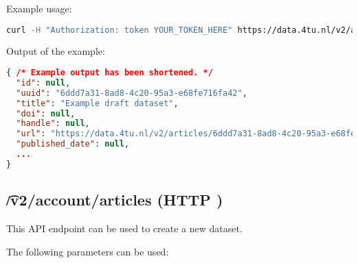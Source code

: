   Example usage:
\begin{lstlisting}[language=bash]
curl -H "Authorization: token YOUR_TOKEN_HERE" https://data.4tu.nl/v2/account/articles | jq
\end{lstlisting}

  Output of the example:
\begin{lstlisting}[language=JSON]
{ /* Example output has been shortened. */
  "id": null,
  "uuid": "6ddd7a31-8ad8-4c20-95a3-e68fe716fa42",
  "title": "Example draft dataset",
  "doi": null,
  "handle": null,
  "url": "https://data.4tu.nl/v2/articles/6ddd7a31-8ad8-4c20-95a3-e68fe716fa42",
  "published_date": null,
  ...
}
\end{lstlisting}

\subsection{\t{/v2/account/articles} (HTTP )}

  This API endpoint can be used to create a new dataset.

  The following parameters can be used:

